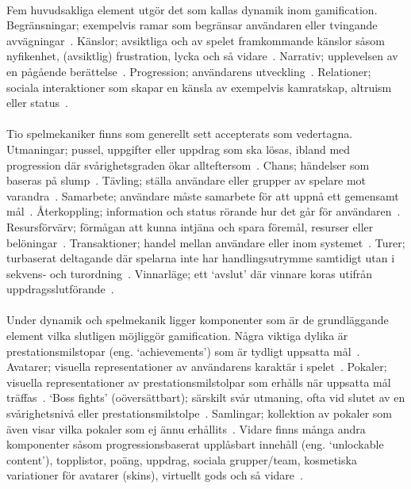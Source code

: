 \paragraph{}
\hspace{-12pt}Fem huvudsakliga element utgör det som kallas dynamik inom gamification.
Begränsningar; exempelvis ramar som begränsar användaren eller tvingande avvägningar~\cite{Cwil2018}.
Känslor; avsiktliga och av spelet framkommande känslor såsom nyfikenhet, (avsiktlig) frustration, lycka och så vidare~\cite{Cwil2018}.
Narrativ; upplevelsen av en pågående berättelse~\cite{Cwil2018}.
Progression; användarens utveckling~\cite{Cwil2018}.
Relationer; sociala interaktioner som skapar en känsla av exempelvis kamratskap, altruism eller status~\cite{Cwil2018}.
\paragraph{}
\hspace{-12pt}Tio spelmekaniker finns som generellt sett accepterats som vedertagna.
Utmaningar; pussel, uppgifter eller uppdrag som ska lösas, ibland med progression där svårighetsgraden ökar allteftersom~\cite{Cwil2018}.
Chans; händelser som baseras på slump~\cite{Cwil2018}.
Tävling; ställa användare eller grupper av spelare mot varandra~\cite{Cwil2018}.
Samarbete; användare måste samarbete för att uppnå ett gemensamt mål~\cite{Cwil2018}.
Återkoppling; information och status rörande hur det går för användaren~\cite{Cwil2018}.
Resursförvärv; förmågan att kunna intjäna och spara föremål, resurser eller belöningar~\cite{Cwil2018}.
Transaktioner; handel mellan användare eller inom systemet~\cite{Cwil2018}.
Turer; turbaserat deltagande där spelarna inte har handlingsutrymme samtidigt utan i sekvens- och turordning~\cite{Cwil2018}.
Vinnarläge; ett \lq{}avslut\rq{} där vinnare koras utifrån uppdragsslutförande~\cite{Cwil2018}.
\paragraph{}
\hspace{-12pt}Under dynamik och spelmekanik ligger komponenter som är de grundläggande element vilka slutligen möjliggör gamification.
Några viktiga dylika är prestationsmilstopar (eng. \lq{}achievements\rq{}) som är tydligt uppsatta mål~\cite{Cwil2018}.
Avatarer; visuella representationer av användarens karaktär i spelet~\cite{Cwil2018}.
Pokaler; visuella representationer av prestationsmilstolpar som erhålls när uppsatta mål träffas~\cite{Cwil2018}.
\lq{}Boss fights\rq{} (oöversättbart); särskilt svår utmaning, ofta vid slutet av en svårighetsnivå eller prestationsmilstolpe~\cite{Cwil2018}.
Samlingar; kollektion av pokaler som även visar vilka pokaler som ej ännu erhållits~\cite{Cwil2018}.
Vidare finns många andra komponenter såsom progressionsbaserat upplåsbart innehåll (eng. \lq{}unlockable content\rq{}), topplistor, poäng, uppdrag, sociala grupper/team, kosmetiska variationer för avatarer (skins), virtuellt gods och så vidare~\cite{Bae2014, Cwil2018}.
